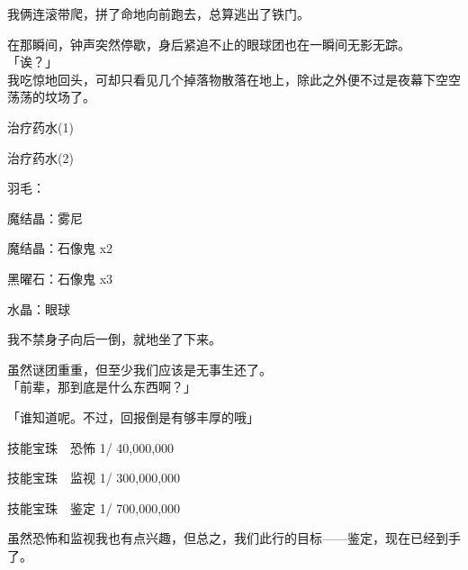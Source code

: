 我俩连滚带爬，拼了命地向前跑去，总算逃出了铁门。

在那瞬间，钟声突然停歇，身后紧追不止的眼球团也在一瞬间无影无踪。\\

「诶？」\\

我吃惊地回头，可却只看见几个掉落物散落在地上，除此之外便不过是夜幕下空空荡荡的坟场了。\\

\cardline

  治疗药水(1)

  治疗药水(2)

  羽毛：

  魔结晶：雾尼

  魔结晶：石像鬼 x2

  黑曜石：石像鬼 x3

  水晶：眼球

\cardline

我不禁身子向后一倒，就地坐了下来。

虽然谜团重重，但至少我们应该是无事生还了。\\

「前辈，那到底是什么东西啊？」

「谁知道呢。不过，回报倒是有够丰厚的哦」\\

\cardline

  技能宝珠　恐怖 1/  40,000,000

  技能宝珠　监视 1/ 300,000,000

  技能宝珠　鉴定 1/ 700,000,000

\cardline

虽然恐怖和监视我也有点兴趣，但总之，我们此行的目标——鉴定，现在已经到手了。\\
